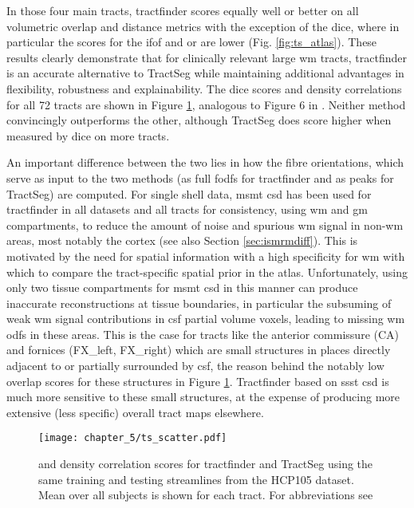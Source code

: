 In those four main tracts, tractfinder scores equally well or better on all volumetric overlap and distance metrics with the exception of the \gls{dice}, where in particular the scores for the \gls{ifof} and \gls{or} are lower (Fig. \ref{fig:ts_atlas}).
These results clearly demonstrate that for clinically relevant large \gls{wm} tracts, tractfinder is an accurate alternative to TractSeg while maintaining additional advantages in flexibility, robustness and explainability.
The \gls{dice} scores and density correlations for all 72 tracts are shown in Figure \ref{fig:ts_all_tracts}, analogous to Figure 6 in \textcite{Wasserthal2018}.
Neither method convincingly outperforms the other, although TractSeg does score higher when measured by \gls{dice} on more tracts.

An important difference between the two lies in how the fibre orientations, which serve as input to the two methods (as full \glspl{fodf} for tractfinder and as peaks for TractSeg) are computed.
For single shell data, \gls{msmt} \gls{csd} has been used for tractfinder in all datasets and all tracts for consistency, using \gls{wm} and \gls{gm} compartments, to reduce the amount of noise and spurious \gls{wm} signal in non-\gls{wm} areas, most notably the cortex (see also Section \ref{sec:ismrmdiff}).
This is motivated by the need for spatial information with a high specificity for \gls{wm} with which to compare the tract-specific spatial prior in the atlas.
Unfortunately, using only two tissue compartments for \gls{msmt} \gls{csd} in this manner can produce inaccurate reconstructions at tissue boundaries, in particular the subsuming of weak \gls{wm} signal contributions in \gls{csf} partial volume voxels, leading to missing \gls{wm} \glspl{odf} in these areas.
This is the case for tracts like the anterior commissure (CA) and fornices (FX\_left, FX\_right) which are small structures in places directly adjacent to or partially surrounded by \gls{csf}, the reason behind the notably low overlap scores for these structures in Figure \ref{fig:ts_all_tracts}.
Tractfinder based on \gls{ssst} \gls{csd} is much more sensitive to these small structures, at the expense of producing more extensive (less specific) overall tract maps elsewhere.

\begin{figure}[h!]
  \texttt{[image: chapter\_5/ts\_scatter.pdf]}
  \caption[Direct comparison between tractfinder and TractSeg, in all tracts]{ and density correlation scores for tractfinder and TractSeg using the same training and testing streamlines from the HCP105 dataset. Mean over all subjects is shown for each tract. For abbreviations see \textcite{Wasserthal2018}}
  \label{fig:ts_all_tracts}
\end{figure}

